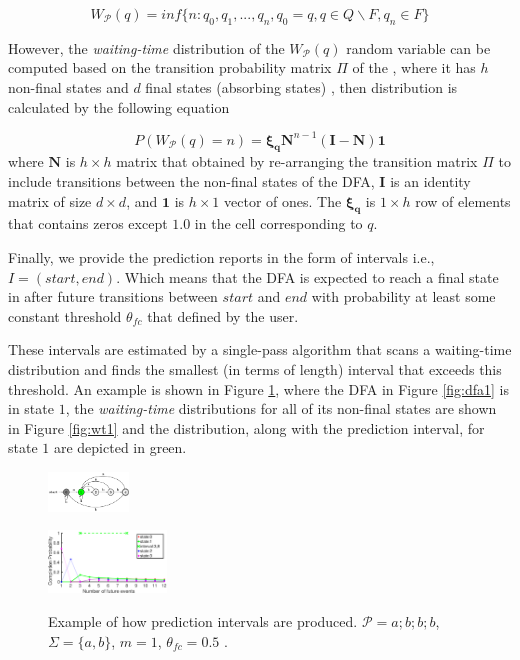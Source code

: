 \begin{equation*}
W_{\mathcal{P}}(q)=inf\{n: q_{0},q_{1},...,q_{n}, q_{0}=q, q \in Q \backslash F, q_{n} \in F\}
\end{equation*}

However, the \textit{waiting-time} distribution of the $W_{\mathcal{P}}(q)$ random variable can be computed based on the transition probability matrix $\Pi$ of the \pmcmr, where it has $h$ non-final states and $d$ final states (absorbing states) \cite{alevizos2017event}, then distribution is calculated by the following equation 

\begin{equation*}
P(W_{\mathcal{P}}(q)=n)=\boldsymbol{\xi_{q}}\boldsymbol{N}^{n-1}(\boldsymbol{I}-\boldsymbol{N})\boldsymbol{1}
\end{equation*}
where $\boldsymbol{N}$ is $h \times h$ matrix that obtained by re-arranging the transition matrix $\Pi$ to include transitions between the non-final states of the DFA, $\boldsymbol{I}$ is an identity matrix of size $d \times d$, and  $\boldsymbol{1}$ is $h \times 1$ vector of ones. The $\boldsymbol{\xi_{q}}$ is $1 \times h$ row of elements that contains zeros except $1.0$ in the cell corresponding to $q$. 
\par Finally, we provide the prediction reports in the form of intervals i.e.,  $I=(\mathit{start},\mathit{end})$. Which means that the DFA is expected to reach a final state in after future transitions between $\mathit{start}$ and $\mathit{end}$ with probability at least some constant threshold $\theta_{fc}$ that defined by the user. 

These intervals are estimated by a single-pass algorithm that scans a waiting-time distribution and finds the smallest (in terms of length) interval that exceeds this threshold. 
An example is shown in Figure \ref{fig:wtdfas},
where the DFA in Figure \ref{fig:dfa1} is in state $1$,
the \textit{waiting-time} distributions for all of its non-final states are shown in Figure \ref{fig:wt1}
and the distribution, along with the prediction interval, for state $1$ are depicted in green.
\begin{figure}[!ht]
\begin{centering}

\includegraphics[width=0.19\textwidth]{./chapters/figures/forecasting/dfa1.pdf}
\label{fig:dfa1}


\includegraphics[width=0.28\textwidth]{./chapters/figures/forecasting/wt1.pdf}
\label{fig:wt1}

\caption{Example of how prediction intervals are produced. 
$\mathcal{P}=a ; b ; b ; b$, $\Sigma=\{a,b\}$, $m=1$, $\theta_{\mathit{fc}}=0.5$      \cite{alevizos2017event}.}
\label{fig:wtdfas}
\end{centering}
\end{figure}

